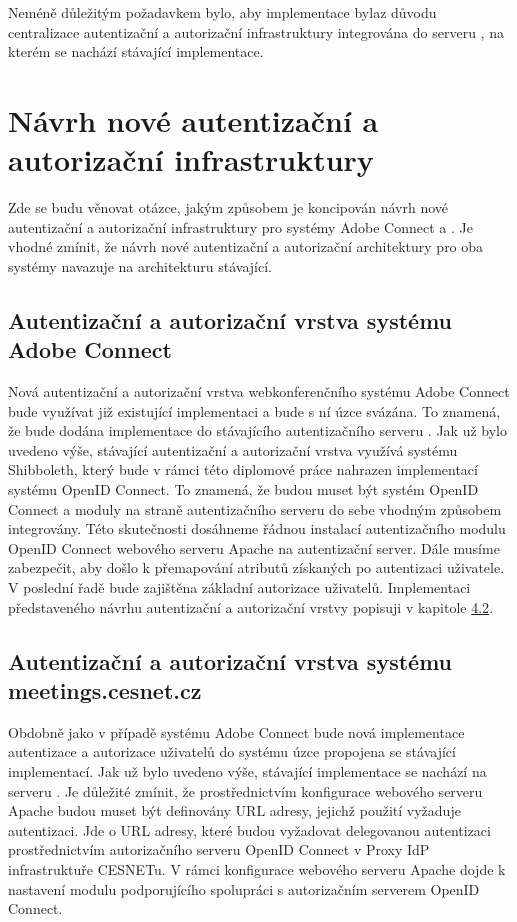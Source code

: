 \documentclass[
  printed, %
  twoside, %
  table,   %
  nolof,     %
  nolot,     %
]{fithesis3}
\begin{document}
\par

Neméně důležitým požadavkem bylo, aby implementace byla\break z důvodu centralizace autentizační a autorizační infrastruktury integrována do serveru , na kterém se nachází stávající implementace. 

\section{Návrh nové autentizační a autorizační infrastruktury}
Zde se budu věnovat otázce, jakým způsobem je koncipován návrh nové autentizační a autorizační infrastruktury pro systémy Adobe Connect a . Je vhodné zmínit, že návrh nové autentizační a autorizační architektury pro oba systémy navazuje na architekturu stávající. 

\subsection{Autentizační a autorizační vrstva systému Adobe Connect}
Nová autentizační a autorizační vrstva webkonferenčního systému Adobe Connect bude využívat již existující implementaci a bude s ní úzce svázána. To znamená, že bude dodána implementace do stávajícího autentizačního serveru . Jak už bylo uvedeno výše, stávající autentizační a autorizační vrstva využívá systému Shibboleth, který bude v rámci této diplomové práce nahrazen implementací systému OpenID Connect. To znamená, že budou muset být systém OpenID Connect a moduly na straně autentizačního serveru  do sebe vhodným způsobem integrovány. Této skutečnosti dosáhneme řádnou instalací autentizačního modulu OpenID Connect webového serveru Apache na autentizační server. Dále musíme zabezpečit, aby došlo k přemapování atributů získaných po autentizaci uživatele. V poslední řadě bude zajištěna základní autorizace uživatelů. Implementaci představeného návrhu autentizační a autorizační vrstvy popisuji v kapitole \hyperref[ACImpl]{4.2}. 

\subsection{Autentizační a autorizační vrstva systému meetings.cesnet.cz}
\label{shong-proposal}
Obdobně jako v případě systému Adobe Connect bude nová implementace autentizace a autorizace uživatelů do systému  úzce propojena se stávající implementací. Jak už bylo uvedeno výše, stávající implementace se nachází na serveru . Je důležité zmínit, že prostřednictvím konfigurace webového serveru Apache budou muset být definovány URL adresy, jejichž použití vyžaduje autentizaci. Jde o URL adresy, které budou vyžadovat delegovanou autentizaci prostřednictvím autorizačního serveru OpenID Connect v Proxy IdP infrastruktuře CESNETu. V rámci konfigurace webového serveru Apache dojde k nastavení modulu podporujícího spolupráci s autorizačním serverem OpenID Connect.  \par
\end{document}
